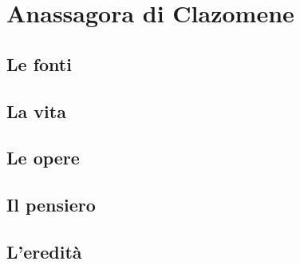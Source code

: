 \chapter{Anassagora di Clazomene}

\section{Le fonti}

\section{La vita}

\section{Le opere}

\section{Il pensiero}

\section{L'eredità}
